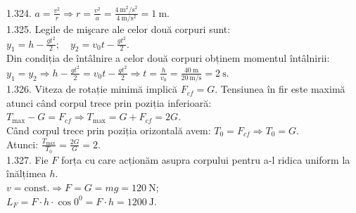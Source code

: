 1.324. $a=\frac{v^{2}}{r} \Rightarrow r=\frac{v^{2}}{a}=\frac{4 \mathrm{~m}^{2} / \mathrm{s}^{2}}{4 \mathrm{~m} / \mathrm{s}^{2}}=1 \mathrm{~m}$.\\

1.325. Legile de mişcare ale celor două corpuri sunt:\\ $y_{1}=h-\frac{g t^{2}}{2}; \quad y_{2}=v_{0} t-\frac{g t^{2}}{2}$.\\ Din condiția de întâlnire a celor două corpuri obținem momentul întâlnirii:\\ $y_{1}=y_{2} \Rightarrow h-\frac{g t^{2}}{2}=v_{0} t-\frac{g t^{2}}{2} \Rightarrow t=\frac{h}{v_{0}}=\frac{40 \mathrm{~m}}{20 \mathrm{~m} / \mathrm{s}}=2 \mathrm{~s}$.\\

1.326. Viteza de rotație minimă implică $F_{c f}=G$. Tensiunea în fir este maximă atunci când corpul trece prin poziția inferioară:\\ $T_{\max}-G=F_{c f} \Rightarrow T_{\max}=G+F_{c f}=2 G$.\\ Când corpul trece prin poziția orizontală avem: $T_{0}=F_{c f} \Rightarrow T_{0}=G$.\\ Atunci: $\frac{T_{\max}}{T_{0}}=\frac{2 G}{G}=2$.\\

1.327. Fie $F$ forța cu care acționăm asupra corpului pentru a-l ridica uniform la înălțimea $h$.\\ $v=\text {const.} \Rightarrow F=G=m g=120 \mathrm{~N}$;\\ $L_{F}=F \cdot h \cdot \cos 0^{0}=F \cdot h=1200 \mathrm{~J}$.\\

